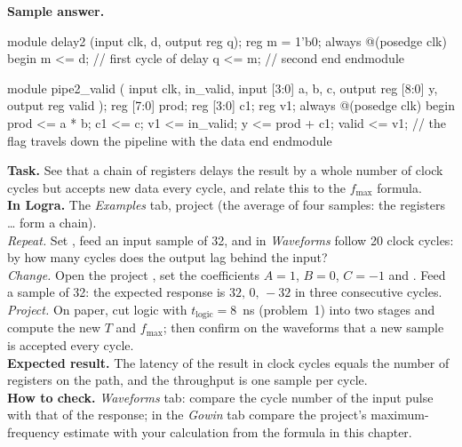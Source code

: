 \textbf{Sample answer.}
\begin{vcode}
module delay2 (input clk, d, output reg q);
    reg m = 1'b0;
    always @(posedge clk) begin
        m <= d;      // first cycle of delay
        q <= m;      // second
    end
endmodule

module pipe2_valid (
    input            clk, in_valid,
    input      [3:0] a, b, c,
    output reg [8:0] y,
    output reg       valid
);
    reg [7:0] prod;
    reg [3:0] c1;
    reg       v1;
    always @(posedge clk) begin
        prod <= a * b;  c1 <= c;  v1 <= in_valid;
        y    <= prod + c1;        valid <= v1;   // the flag travels down the pipeline with the data
    end
endmodule
\end{vcode}

\begin{diybox}
\textbf{Task.} See that a chain of registers delays the result by a whole
number of clock cycles but accepts new data every cycle, and relate this to
the $f_\text{max}$ formula.\\
\textbf{In Logra.} The \emph{Examples} tab, project 
(the average of four samples: the registers \ldots{}
form a chain).\\
 \emph{Repeat.} Set , feed an input sample of
32, and in \emph{Waveforms} follow 20 clock cycles: by how many cycles does
the output lag behind the input?\\
 \emph{Change.} Open the project , set the
coefficients $A=1$, $B=0$, $C=-1$ and . Feed a sample of
32: the expected response is $32,\,0,\,-32$ in three consecutive cycles.\\
 \emph{Project.} On paper, cut logic with $t_\text{logic}=8$~ns
(problem~1) into two stages and compute the new $T$ and $f_\text{max}$; then
confirm on the waveforms that a new sample is accepted every cycle.\\
\textbf{Expected result.} The latency of the result in clock cycles equals the
number of registers on the path, and the throughput is one sample per cycle.\\
\textbf{How to check.} \emph{Waveforms} tab: compare the cycle number of the
input pulse with that of the response; in the \emph{Gowin} tab compare the
project's maximum-frequency estimate with your calculation from the formula in
this chapter.
\end{diybox}

